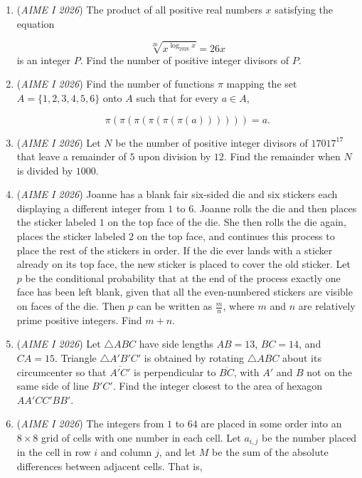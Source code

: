 \begin{enumerate}
 

	\item (\textit{AIME I 2026}) The product of all positive real numbers $x$ satisfying the equation 

 \[\sqrt[20]{x^{\log_{2026}x}}=26x\]
is an integer $P$. Find the number of positive integer divisors of $P$.


 

	\item (\textit{AIME I 2026}) Find the number of functions $\pi$ mapping the set $A=\{1,2,3,4,5,6\}$ onto $A$ such that for every $a\in A$, 

 \[\pi(\pi(\pi(\pi(\pi(\pi(a))))))=a.\]


	\item (\textit{AIME I 2026}) Let $N$ be the number of positive integer divisors of $17017^{17}$ that leave a remainder of $5$ upon division by $12$. Find the remainder when $N$ is divided by $1000$.


 

	\item (\textit{AIME I 2026}) Joanne has a blank fair six-sided die and six stickers each displaying a different integer from $1$ to $6$. Joanne rolls the die and then places the sticker labeled $1$ on the top face of the die. She then rolls the die again, places the sticker labeled $2$ on the top face, and continues this process to place the rest of the stickers in order. If the die ever lands with a sticker already on its top face, the new sticker is placed to cover the old sticker. Let $p$ be the conditional probability that at the end of the process exactly one face has been left blank, given that all the even-numbered stickers are visible on faces of the die. Then $p$ can be written as $\frac{m}{n}$, where $m$ and $n$ are relatively prime positive integers. Find $m+n$.


 

	\item (\textit{AIME I 2026}) Let $\triangle ABC$ have side lengths $AB=13$, $BC=14$, and $CA=15$. Triangle $\triangle A'B'C'$ is obtained by rotating $\triangle ABC$ about its circumcenter so that $\overline{A'C'}$ is perpendicular to $\overline{BC}$, with $A'$ and $B$ not on the same side of line $B'C'$. Find the integer closest to the area of hexagon $AA'CC'BB'$.


 

	\item (\textit{AIME I 2026}) The integers from $1$ to $64$ are placed in some order into an $8\times 8$ grid of cells with one number in each cell. Let $a_{i,j}$ be the number placed in the cell in row $i$ and column $j$, and let $M$ be the sum of the absolute differences between adjacent cells. That is,


\end{enumerate}
